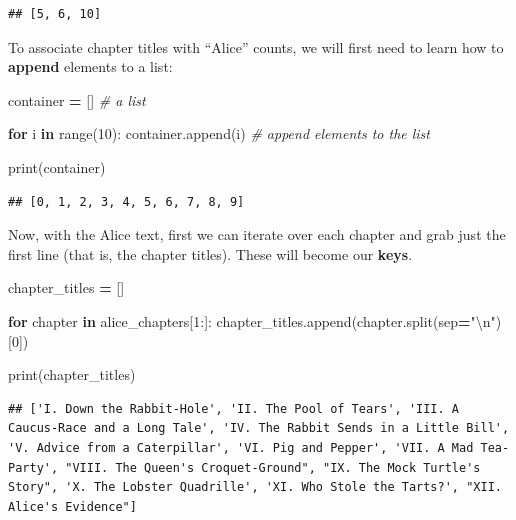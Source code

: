 \documentclass[
]{book}
\newenvironment{Shaded}{\begin{snugshade}}{\end{snugshade}}
\newcommand{\BuiltInTok}[1]{#1}
\newcommand{\CharTok}[1]{\textcolor[rgb]{0.31,0.60,0.02}{#1}}
\newcommand{\CommentTok}[1]{\textcolor[rgb]{0.56,0.35,0.01}{\textit{#1}}}
\newcommand{\ControlFlowTok}[1]{\textcolor[rgb]{0.13,0.29,0.53}{\textbf{#1}}}
\newcommand{\DecValTok}[1]{\textcolor[rgb]{0.00,0.00,0.81}{#1}}
\newcommand{\KeywordTok}[1]{\textcolor[rgb]{0.13,0.29,0.53}{\textbf{#1}}}
\newcommand{\NormalTok}[1]{#1}
\newcommand{\OperatorTok}[1]{\textcolor[rgb]{0.81,0.36,0.00}{\textbf{#1}}}
\newcommand{\StringTok}[1]{\textcolor[rgb]{0.31,0.60,0.02}{#1}}
\begin{document}
\begin{verbatim}
## [5, 6, 10]
\end{verbatim}

To associate chapter titles with ``Alice'' counts, we will first need to learn how to \textbf{append} elements to a list:

\begin{Shaded}
\begin{Highlighting}[]
\NormalTok{container }\OperatorTok{=}\NormalTok{ [] }\CommentTok{\# a list}

\ControlFlowTok{for}\NormalTok{ i }\KeywordTok{in} \BuiltInTok{range}\NormalTok{(}\DecValTok{10}\NormalTok{):}
\NormalTok{    container.append(i) }\CommentTok{\# append elements to the list}

\BuiltInTok{print}\NormalTok{(container)    }
\end{Highlighting}
\end{Shaded}

\begin{verbatim}
## [0, 1, 2, 3, 4, 5, 6, 7, 8, 9]
\end{verbatim}

Now, with the Alice text, first we can iterate over each chapter and grab just the first line (that is, the chapter titles). These will become our \textbf{keys}.

\begin{Shaded}
\begin{Highlighting}[]
\NormalTok{chapter\_titles }\OperatorTok{=}\NormalTok{ []}

\ControlFlowTok{for}\NormalTok{ chapter }\KeywordTok{in}\NormalTok{ alice\_chapters[}\DecValTok{1}\NormalTok{:]:}
\NormalTok{    chapter\_titles.append(chapter.split(sep}\OperatorTok{=}\StringTok{"}\CharTok{\textbackslash{}n}\StringTok{"}\NormalTok{)[}\DecValTok{0}\NormalTok{])}

\BuiltInTok{print}\NormalTok{(chapter\_titles)}
\end{Highlighting}
\end{Shaded}

\begin{verbatim}
## ['I. Down the Rabbit-Hole', 'II. The Pool of Tears', 'III. A Caucus-Race and a Long Tale', 'IV. The Rabbit Sends in a Little Bill', 'V. Advice from a Caterpillar', 'VI. Pig and Pepper', 'VII. A Mad Tea-Party', "VIII. The Queen's Croquet-Ground", "IX. The Mock Turtle's Story", 'X. The Lobster Quadrille', 'XI. Who Stole the Tarts?', "XII. Alice's Evidence"]
\end{verbatim}
\end{document}
